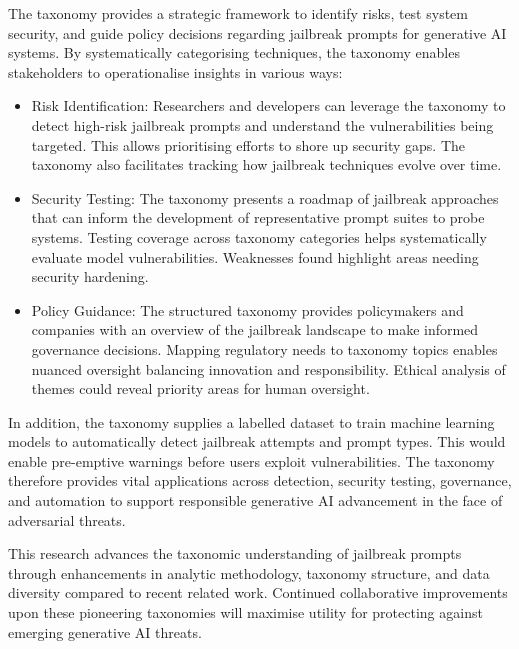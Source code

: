 \documentclass[
  letterpaper,
  DIV=11,
  numbers=noendperiod]{scrartcl}
\providecommand{\tightlist}{%
  \setlength{\itemsep}{0pt}\setlength{\parskip}{0pt}}\usepackage{longtable,booktabs,array}
\begin{document}
The taxonomy provides a strategic framework to identify risks, test
system security, and guide policy decisions regarding jailbreak prompts
for generative AI systems. By systematically categorising techniques,
the taxonomy enables stakeholders to operationalise insights in various
ways:

\begin{itemize}
\tightlist
\item
  Risk Identification: Researchers and developers can leverage the
  taxonomy to detect high-risk jailbreak prompts and understand the
  vulnerabilities being targeted. This allows prioritising efforts to
  shore up security gaps. The taxonomy also facilitates tracking how
  jailbreak techniques evolve over time.
\item
  Security Testing: The taxonomy presents a roadmap of jailbreak
  approaches that can inform the development of representative prompt
  suites to probe systems. Testing coverage across taxonomy categories
  helps systematically evaluate model vulnerabilities. Weaknesses found
  highlight areas needing security hardening.
\item
  Policy Guidance: The structured taxonomy provides policymakers and
  companies with an overview of the jailbreak landscape to make informed
  governance decisions. Mapping regulatory needs to taxonomy topics
  enables nuanced oversight balancing innovation and responsibility.
  Ethical analysis of themes could reveal priority areas for human
  oversight.
\end{itemize}

In addition, the taxonomy supplies a labelled dataset to train machine
learning models to automatically detect jailbreak attempts and prompt
types. This would enable pre-emptive warnings before users exploit
vulnerabilities. The taxonomy therefore provides vital applications
across detection, security testing, governance, and automation to
support responsible generative AI advancement in the face of adversarial
threats.

This research advances the taxonomic understanding of jailbreak prompts
through enhancements in analytic methodology, taxonomy structure, and
data diversity compared to recent related work. Continued collaborative
improvements upon these pioneering taxonomies will maximise utility for
protecting against emerging generative AI threats.
\end{document}
